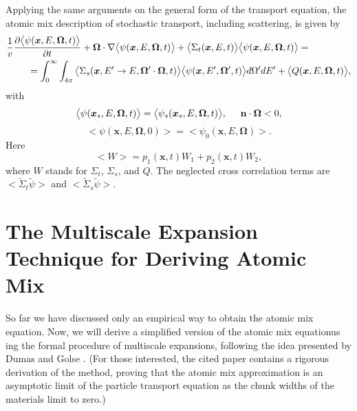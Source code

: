 \documentclass[12pt]{article}
\newcommand{\bl}{\big<}
\newcommand{\bg}{\big>}
\newcommand{\n}{ \noindent}
\begin{document}
Applying the same arguments on the general form of the transport equation, the atomic mix description of stochastic transport, including scattering, is given by
\begin{equation}\label{atmixeqgeral}
\begin{split}
&\frac{1}{v}\frac{\partial \bl\psi(\bm x,E,\bm\Omega,t)\bg}{\partial t} + 
\bm\Omega\cdot \nabla  \bl\psi(\bm x,E,\bm\Omega,t)\bg +
 \bl\Sigma_t (\bm x,E,t)\bg\bl\psi(\bm x,E,\bm\Omega,t)\bg  = 
\\&\hspace{0.8 cm} =
\int_0^{\infty}\int_{4\pi}\bl\Sigma_s(\bm x, E'\rightarrow E,\bm\Omega'\cdot\bm\Omega,t)\bg
\bl\psi(\bm x,E',\bm\Omega',t)\bg d\Omega'dE'+\bl Q(\bm x, E, \bm\Omega,t)\bg  ,
\end{split}
\end{equation}
with 
\begin{equation}
\bl \psi(\bm x_s,E,\bm\Omega,t)\bg = \bl\psi_s(\bm x_s,E,\bm\Omega,t)\bg, \hspace{0.5 cm} \mathbf{n}\cdot\bm\Omega<0,
\end{equation}
\begin{equation}
\bl \psi(\bm x,E,\bm\Omega,0)\bg = \bl\psi_0(\bm x,E,\bm\Omega)\bg. 
\end{equation}
\n Here 
\begin{equation}\label{expected_value_general}
\bl W\bg = p_1(\bm x,t)W_1 + p_2(\bm x,t)W_2,
\end{equation}
\n where $W$ stands for $\Sigma_t$, $\Sigma_s$, and $Q$. 
The neglected cross correlation terms are $\bl\tilde\Sigma_t\tilde\psi\bg$ and $\bl\tilde\Sigma_s\tilde\psi\bg$.
 

\section*{The Multiscale Expansion Technique for Deriving Atomic Mix}

So far we have discussed only an empirical way to obtain the atomic mix equation.
Now, we will derive a simplified version of the atomic mix equationus ing the formal procedure of multiscale expansions, following the idea presented by
Dumas and Golse \cite{dumas_00}.
(For those interested, the cited paper contains a rigorous derivation of the method, proving that the atomic mix approximation is an asymptotic limit of the particle transport equation as the chunk widths of the materials limit to zero.)
\end{document}
